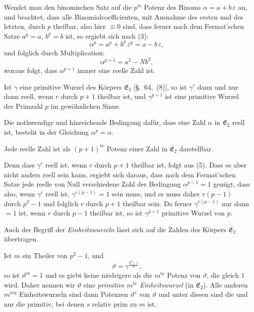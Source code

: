 \documentclass[12pt,a4paper]{article}
\begin{document}
Wendet man den binomischen Satz auf die $p^{\text{te}}$ Potenz des Binoms $\alpha = a + b\,\varepsilon$ an, und beachtet, dass alle Binomialcoefficienten, mit Ausnahme des ersten und des letzten, durch $p$ theilbar, also hier $\equiv 0$ sind, dass ferner nach dem Fermat'schen Satze $a^{p} = a$, $b^{p} = b$ ist, so ergiebt sich nach (3):
\begin{equation}\label{eq:67.4}
\tag{4}
\alpha^{p} = a^{p} + b^{p}\,\varepsilon^{p} = a - b\,\varepsilon,
\end{equation}
und folglich durch Multiplication:
\begin{equation}\label{eq:67.5}
\tag{5}
\alpha^{p+1} = a^{2} - Nb^{2},
\end{equation}
woraus folgt, dass $\alpha^{p+1}$ immer eine reelle Zahl ist.

Ist $\gamma$ eine primitive Wurzel des Körpers $\mathfrak{E}_{2}$ [\S.~64,~(8)], so ist $\gamma^{r}$ dann und nur dann reell, wenn $r$ durch $p + 1$ theilbar ist, und $\gamma^{p+1}$ ist eine primitive Wurzel der Primzahl $p$ im gewöhnlichen Sinne.

Die nothwendige und hinreichende Bedingung dafür, dass eine Zahl $\alpha$ in $\mathfrak{E}_{2}$ reell ist, besteht in der Gleichung $\alpha^{p} = \alpha$.

Jede reelle Zahl ist als $(p+1)^{\text{te}}$ Potenz einer Zahl in $\mathfrak{E}_{2}$ darstellbar.

Denn dass $\gamma^{r}$ reell ist, wenn $r$ durch $p+1$ theilbar ist, folgt aus (5). Dass es aber nicht anders reell sein kann, ergiebt sich daraus, dass nach dem Fermat'schen Satze jede reelle von Null verschiedene Zahl der Bedingung $\alpha^{p-1} = 1$ genügt, dass also, wenn $\gamma^{r}$ reell ist, $\gamma^{r(p-1)} = 1$ sein muss, und es muss daher $r(p-1)$ durch $p^{2} - 1$ und folglich $r$ durch $p+1$ theilbar sein. Da ferner $\gamma^{r(p-1)}$ nur dann $= 1$ ist, wenn $r$ durch $p-1$ theilbar ist, so ist $\gamma^{p+1}$ primitive Wurzel von $p$.

Auch der Begriff der \emph{Einheitswurzeln} lässt sich auf die Zahlen des Körpers $\mathfrak{E}_{2}$ übertragen.

Ist $m$ ein Theiler von $p^{2} - 1$, und
\[
\vartheta = \gamma^{\frac{p^{2}-1}{m}},
\]
so ist $\vartheta^{m} = 1$ und es giebt keine niedrigere als die $m^{\text{te}}$ Potenz von $\vartheta$, die gleich $1$ wird. Daher nennen wir $\vartheta$ eine \emph{primitive $m^{\text{te}}$ Einheitswurzel} (in $\mathfrak{E}_{2}$). Alle anderen $m^{\text{ten}}$ Einheitswurzeln sind dann Potenzen $\vartheta^{s}$ von $\vartheta$ und unter diesen sind die und nur die primitiv, bei denen $s$ relativ prim zu $m$ ist.
\end{document}
